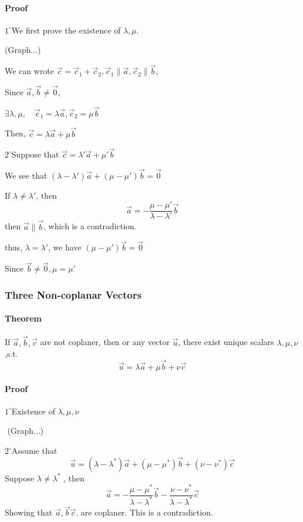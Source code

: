 \documentclass[UTF8]{ctexart}
\begin{document}
 \paragraph{Proof}
 
 $1^{\circ}$We first prove the existence of $\lambda, \mu $. 

(Graph...)

We can wrote $\vec c = \vec  c_1+ \vec  c_2, \vec c_1 \parallel \vec a, \vec c_2 \parallel \vec  b$, 

Since $\vec a,\vec  b \neq \vec  0$, 

$\exists \lambda,\mu,\quad \vec c_1 = \lambda \vec a, \vec c_2 = \mu \vec b$

Then, $\vec c = \lambda \vec  a+\mu \vec  b$

$2^{\circ}$Suppose that $\vec c = \lambda ' \vec  a+\mu '\vec  b $

We see that $(\lambda - \lambda ')\vec  a +(\mu - \mu ')\vec b  = \vec  0$

If $\lambda \neq \lambda '$, then 
$$
\vec a  = - \frac {\mu - \mu '}{\lambda - \lambda  ' }\vec b
$$
then $\vec a \parallel \vec b$, which is a contradiction.

thus, $\lambda = \lambda '$, we have $(\mu - \mu ')\vec b = \vec 0$

Since $\vec b \neq \vec 0 , \mu = \mu '$


\subsubsection{Three Non-coplanar Vectors}




\paragraph{Theorem} If $\vec a, \vec b , \vec c$ are not coplaner, then or any vector $\vec u$, there exist unique scalars $\lambda,\mu,\nu$,s.t.
  $$
  \vec u =\lambda \vec a+ \mu \vec b + \nu \vec c
  $$
\paragraph{Proof} 
$1^{\circ}$Existence of $\lambda,\mu ,\nu $

  ​			(Graph...)

  ​			$2^{\circ}$Assume that 
  $$
  \vec u = (\lambda  - \lambda^*)\vec a + (\mu - \mu^*)\vec b + (\nu - \nu^*)\vec c
  $$
  ​				Suppose $\lambda \neq \lambda^*$ , then 
  $$
  \vec a  = - \frac{\mu - \mu^*}{\lambda- \lambda^*}\vec b - \frac {\nu - \nu^*}{\lambda - \lambda^*}\vec c
  $$
  ​				Showing that $\vec a,\vec b \vec c $. are coplaner. This is a contradiction. 
\end{document}
